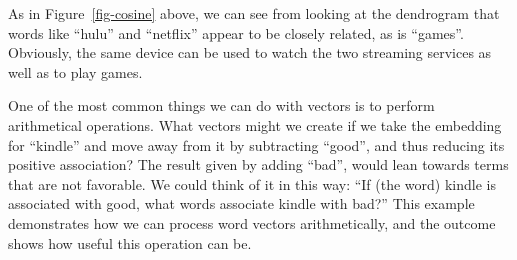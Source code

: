 As in Figure~\ref{fig-cosine} above, we can see from looking at the
dendrogram that words like ``hulu'' and ``netflix'' appear to be closely
related, as is ``games''. Obviously, the same device
can be used to watch the two streaming services as well as to play
games.

One of the most common things we can do with vectors is to perform
arithmetical operations. What vectors might we create if we take the
embedding for ``kindle'' and move away from it by subtracting ``good'', and
thus reducing its positive association? The result given by
adding ``bad'', would lean towards terms that are not favorable. We
could think of it in this way: ``If (the word) kindle is associated with good, what
words associate kindle with bad?'' This example demonstrates how we can
 process word vectors arithmetically, and the outcome shows how useful this
operation can be.

\begin{Shaded}
\begin{Highlighting}[]
\OtherTok{\textless{}{-}}  \NormalTok{, } \NormalTok{)}
\OtherTok{\textless{}{-}}  \NormalTok{, } \NormalTok{)}
\OtherTok{\textless{}{-}}  \NormalTok{, } \NormalTok{)}

\OtherTok{\textless{}{-}}\SpecialCharTok{{-}}\SpecialCharTok{+}

\OtherTok{\textless{}{-}}  \NormalTok{, } \NormalTok{)}
\end{Highlighting}
\end{Shaded}

